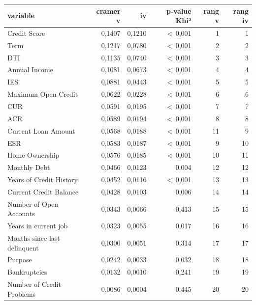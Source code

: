 \begin{tabular}{lrrrrr}
\toprule
\textbf{variable} & \textbf{cramer v} & \textbf{iv} & \textbf{p-value Khi²} & \textbf{rang v} & \textbf{rang iv} \\
\midrule
Credit Score & 0,1407 & 0,1210 & $<$\,0,001 & 1 & 1 \\
Term & 0,1217 & 0,0780 & $<$\,0,001 & 2 & 2 \\
DTI & 0,1135 & 0,0740 & $<$\,0,001 & 3 & 3 \\
Annual Income & 0,1081 & 0,0673 & $<$\,0,001 & 4 & 4 \\
IES & 0,0881 & 0,0443 & $<$\,0,001 & 5 & 5 \\
Maximum Open Credit & 0,0622 & 0,0228 & $<$\,0,001 & 6 & 6 \\
CUR & 0,0591 & 0,0195 & $<$\,0,001 & 7 & 7 \\
ACR & 0,0589 & 0,0194 & $<$\,0,001 & 8 & 8 \\
Current Loan Amount & 0,0568 & 0,0188 & $<$\,0,001 & 11 & 9 \\
ESR & 0,0583 & 0,0187 & $<$\,0,001 & 9 & 10 \\
Home Ownership & 0,0576 & 0,0185 & $<$\,0,001 & 10 & 11 \\
Monthly Debt & 0,0466 & 0,0123 & 0,004 & 12 & 12 \\
Years of Credit History & 0,0452 & 0,0116 & $<$\,0,001 & 13 & 13 \\
Current Credit Balance & 0,0428 & 0,0103 & 0,006 & 14 & 14 \\
Number of Open Accounts & 0,0343 & 0,0066 & 0,413 & 15 & 15 \\
Years in current job & 0,0323 & 0,0055 & 0,017 & 16 & 16 \\
Months since last delinquent & 0,0300 & 0,0051 & 0,314 & 17 & 17 \\
Purpose & 0,0242 & 0,0033 & 0,032 & 18 & 18 \\
Bankruptcies & 0,0132 & 0,0010 & 0,241 & 19 & 19 \\
Number of Credit Problems & 0,0086 & 0,0004 & 0,445 & 20 & 20 \\
\bottomrule
\end{tabular}
